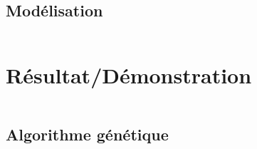 \documentclass{beamer}
\begin{document}
        \subsection{Modélisation}
            \begin{frame}
                \begin{columns}[t]
                    \begin{column}{5cm}
                        \tableofcontents[sections={1-4}, currentsubsection, currentsection]
                    \end{column}
                    \begin{column}{5cm}
                        \tableofcontents[sections={5-8}, currentsubsection, currentsection]
                    \end{column}
                \end{columns}
            \end{frame}
        	
        	
    \section{Résultat/Démonstration}
        \begin{frame}
            \begin{columns}[t]
  				\begin{column}{5cm}
  					\tableofcontents[sections={1-4}, currentsection]
  				\end{column}
  				\begin{column}{5cm}
  					\tableofcontents[sections={5-8}, currentsection]
  				\end{column}
  			\end{columns}
        \end{frame}
       \subsection{Algorithme génétique}
            \begin{frame}
                \begin{columns}[t]
                    \begin{column}{5cm}
                        \tableofcontents[sections={1-4}, currentsubsection]
                    \end{column}
                    \begin{column}{5cm}
                        \tableofcontents[sections={5-8}, currentsubsection]
                    \end{column}
                \end{columns}
            \end{frame}
        	
\end{document}
